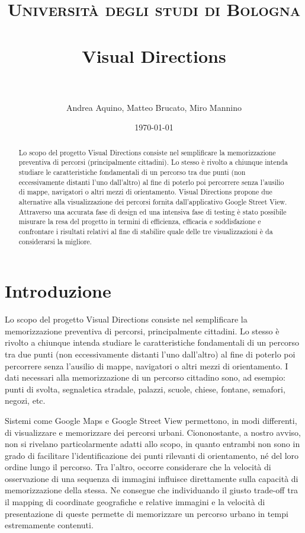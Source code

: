 \documentclass[12pt,a4paper,openright, notitlepage]{report}
\title{	
\normalfont \normalsize 
\textsc{Università degli studi di Bologna} \\ [25pt]
\horrule{0.5pt} \\[0.4cm]
\huge Visual Directions \\
\horrule{2pt} \\[0.5cm]
}
\author{Andrea Aquino, Matteo Brucato, Miro Mannino}
\date{\normalsize\today}
\begin{document}
\maketitle

\begin{abstract}
Lo scopo del progetto Visual Directions consiste nel semplificare la memorizzazione preventiva di percorsi (principalmente cittadini). Lo stesso è rivolto a chiunque intenda studiare le caratteristiche fondamentali di un percorso tra due punti (non eccessivamente distanti l’uno dall’altro) al fine di poterlo poi percorrere senza l’ausilio di mappe, navigatori o altri mezzi di orientamento. Visual Directions propone due alternative alla visualizzazione dei percorsi fornita dall’applicativo Google Street View. Attraverso una accurata fase di design ed una intensiva fase di testing è stato possibile misurare la resa del progetto in termini di efficienza, efficacia e soddisfazione e confrontare i risultati relativi al fine di stabilire quale delle tre visualizzazioni è da considerarsi la migliore.
\end{abstract}


\chapter{Introduzione}

Lo scopo del progetto Visual Directions consiste nel semplificare la memorizzazione preventiva di percorsi, principalmente cittadini. Lo stesso è rivolto a chiunque intenda studiare le caratteristiche fondamentali di un percorso tra due punti (non eccessivamente distanti l’uno dall’altro) al fine di poterlo poi percorrere senza l’ausilio di mappe, navigatori o altri mezzi di orientamento. I dati necessari alla memorizzazione di un percorso cittadino sono, ad esempio: punti di svolta, segnaletica stradale, palazzi, scuole, chiese, fontane, semafori, negozi, etc. 

Sistemi come Google Maps e Google Street View permettono, in modi differenti, di visualizzare e memorizzare dei percorsi urbani. Ciononostante, a nostro avviso, non si rivelano particolarmente adatti allo scopo, in quanto entrambi non sono in grado di facilitare l’identificazione dei punti rilevanti di orientamento, né del loro ordine lungo il percorso. Tra l’altro, occorre considerare che la velocità di osservazione di una sequenza di immagini influisce direttamente sulla capacità di memorizzazione della stessa. Ne consegue che individuando il giusto trade-off tra il mapping di coordinate geografiche e relative immagini e la velocità di presentazione di queste permette di memorizzare un percorso urbano in tempi estremamente contenuti.
\end{document}
